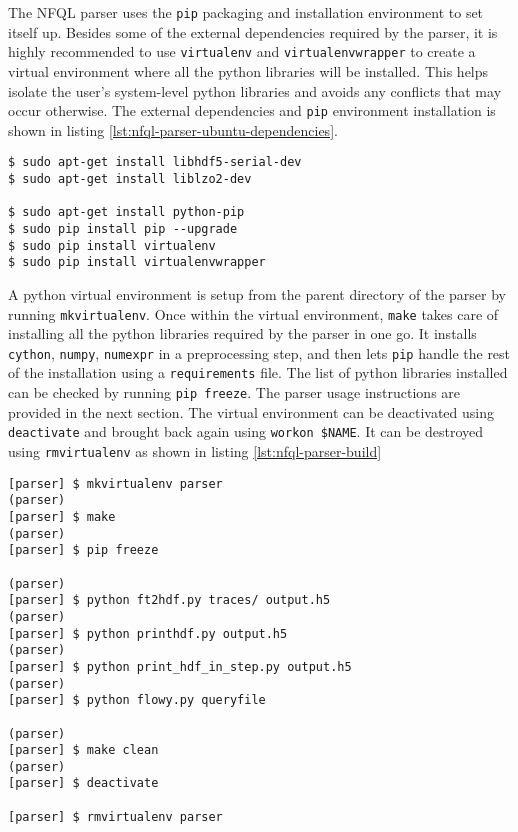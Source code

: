 The \ac{NFQL} parser uses the \texttt{pip} packaging and installation
environment to set itself up. Besides some of the external dependencies
required by the parser, it is highly recommended to use \texttt{virtualenv}
and \texttt{virtualenvwrapper}  to
create a virtual environment where all the python libraries will be installed.
This helps isolate the user's system-level python libraries and avoids any
conflicts that may occur otherwise. The external dependencies and \texttt{pip}
environment installation is shown in listing
\ref{lst:nfql-parser-ubuntu-dependencies}.

\begin{lstlisting}
$ sudo apt-get install libhdf5-serial-dev
$ sudo apt-get install liblzo2-dev

$ sudo apt-get install python-pip
$ sudo pip install pip --upgrade
$ sudo pip install virtualenv
$ sudo pip install virtualenvwrapper
\end{lstlisting}

A python virtual environment is setup from the parent directory of the parser
by running \texttt{mkvirtualenv}. Once within the virtual environment,
\texttt{make} takes care of installing all the python libraries required by
the parser in one go. It installs \texttt{cython}, \texttt{numpy},
\texttt{numexpr} in a preprocessing step, and then lets \texttt{pip} handle
the rest of the installation using a \texttt{requirements} file. The list of
python libraries installed can be checked by running \texttt{pip freeze}. The
parser usage instructions are provided in the next section. The virtual
environment can be deactivated using \texttt{deactivate} and brought back
again using \texttt{workon \$NAME}. It can be destroyed using
\texttt{rmvirtualenv} as shown in listing \ref{lst:nfql-parser-build}

\begin{lstlisting}
[parser] $ mkvirtualenv parser
(parser)
[parser] $ make
(parser)
[parser] $ pip freeze

(parser)
[parser] $ python ft2hdf.py traces/ output.h5
(parser)
[parser] $ python printhdf.py output.h5
(parser)
[parser] $ python print_hdf_in_step.py output.h5
(parser)
[parser] $ python flowy.py queryfile

(parser)
[parser] $ make clean
(parser)
[parser] $ deactivate

[parser] $ rmvirtualenv parser
\end{lstlisting}

